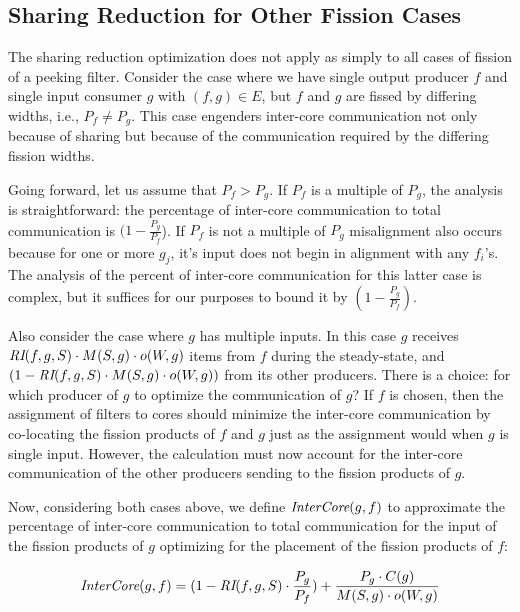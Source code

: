 \subsection{Sharing Reduction for Other Fission Cases}

The sharing reduction optimization does not apply as simply to all
cases of fission of a peeking filter.  Consider the case where we have
single output producer $f$ and single input consumer $g$ with $(f,g)
\in E$, but $f$ and $g$ are fissed by differing widths, i.e., $P_f \ne
P_g$.  This case engenders inter-core communication not only because
of sharing but because of the communication required by the differing
fission widths.  

Going forward, let us assume that $P_f > P_g$.  If $P_f$ is a multiple
of $P_g$, the analysis is straightforward: the percentage of
inter-core communication to total communication is $(1 -
\frac{P_g}{P_f}$). If $P_f$ is not a multiple of $P_g$ misalignment
also occurs because for one or more $g_j$, it's input does not begin
in alignment with any $f_i$'s.  The analysis of the percent of
inter-core communication for this latter case is complex, but it
suffices for our purposes to bound it by $(1 - \frac{P_g}{P_f})$.

Also consider the case where $g$ has multiple inputs. In this case $g$
receives $\mbox{\it RI}(f, g, S) \cdot M(S, g) \cdot o(W,g)$ items from $f$
during the steady-state, and $(1 -\mbox{\it RI}(f, g, S) \cdot M(S, g) \cdot
o(W,g))$ from its other producers. There is a choice: for which
producer of $g$ to optimize the communication of $g$? If $f$ is
chosen, then the assignment of filters to cores should minimize the
inter-core communication by co-locating the fission products of $f$
and $g$ just as the assignment would when $g$ is single input.
However, the calculation must now account for the inter-core
communication of the other producers sending to the fission products
of $g$. 

Now, considering both cases above, we define $\mbox{\it InterCore}(g, f)$ to
approximate the percentage of inter-core communication to total
communication for the input of the fission products of $g$ optimizing
for the placement of the fission products of $f$:

\begin{equation}
\label{eq:tcomm-fopt}
 \mt{InterCore}(g, f)   =  (1 -\mt{RI}(f,g, S) \cdot \frac{P_g}{P_f})
 + \frac{P_g \cdot C(g)}{M(S, g) \cdot o(W, g)}
\end{equation}

